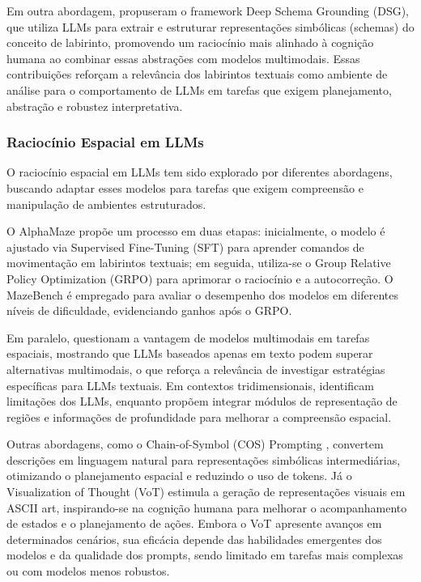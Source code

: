Em outra abordagem, \cite{hsu2025whatmakesmazelooklike} propuseram o framework Deep Schema Grounding (DSG), que utiliza LLMs para extrair e estruturar representações simbólicas (schemas) do conceito de labirinto, promovendo um raciocínio mais alinhado à cognição humana ao combinar essas abstrações com modelos multimodais. Essas contribuições reforçam a relevância dos labirintos textuais como ambiente de análise para o comportamento de LLMs em tarefas que exigem planejamento, abstração e robustez interpretativa.

\subsubsection{Raciocínio Espacial em LLMs}

O raciocínio espacial em LLMs tem sido explorado por diferentes abordagens, buscando adaptar esses modelos para tarefas que exigem compreensão e manipulação de ambientes estruturados.

O AlphaMaze \cite{dao2025alphamaze} propõe um processo em duas etapas: inicialmente, o modelo é ajustado via Supervised Fine-Tuning (SFT) para aprender comandos de movimentação em labirintos textuais; em seguida, utiliza-se o Group Relative Policy Optimization (GRPO) para aprimorar o raciocínio e a autocorreção. O MazeBench é empregado para avaliar o desempenho dos modelos em diferentes níveis de dificuldade, evidenciando ganhos após o GRPO.

Em paralelo, \cite{wang2024pictureworththousandwords} questionam a vantagem de modelos multimodais em tarefas espaciais, mostrando que LLMs baseados apenas em texto podem superar alternativas multimodais, o que reforça a relevância de investigar estratégias específicas para LLMs textuais. Em contextos tridimensionais, \cite{zhang2025doespointcloudboost} identificam limitações dos LLMs, enquanto \cite{cheng2024spatialrgpt} propõem integrar módulos de representação de regiões e informações de profundidade para melhorar a compreensão espacial.

Outras abordagens, como o Chain-of-Symbol (COS) Prompting \cite{hu2024chainofsymbol}, convertem descrições em linguagem natural para representações simbólicas intermediárias, otimizando o planejamento espacial e reduzindo o uso de tokens. Já o Visualization of Thought (VoT) \cite{wu2024visualizationofthought} estimula a geração de representações visuais em ASCII art, inspirando-se na cognição humana para melhorar o acompanhamento de estados e o planejamento de ações. Embora o VoT apresente avanços em determinados cenários, sua eficácia depende das habilidades emergentes dos modelos e da qualidade dos prompts, sendo limitado em tarefas mais complexas ou com modelos menos robustos.

